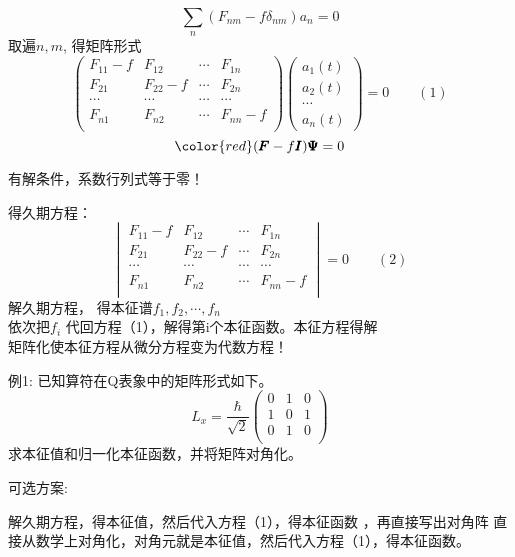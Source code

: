 \begin{frame} 
    $$ \sum_n (F_{nm} -f \delta_{nm})a_n=0 $$
    取遍$n,m$, 得矩阵形式\\            
    $$\begin{pmatrix}
        F_{11}-f & F_{12} & \cdots & F_{1n} \\
        F_{21} & F_{22}-f & \cdots & F_{2n} \\
        \cdots & \cdots &  \cdots& \cdots\\
         F_{n1} & F_{n2} & \cdots & F_{nn}-f \\
     \end{pmatrix}
     \begin{pmatrix}
         a_1(t)\\
         a_2(t)\\
         \cdots \\
         a_n(t)
     \end{pmatrix}
     =0 \qquad (1)$$
     $$ \color{red} (\pmb F -f \pmb I) \pmb \Psi =0 $$

    有解条件，系数行列式等于零！
\end{frame}

\begin{frame} 
    得久期方程：
    $$\begin{vmatrix}
        F_{11}-f & F_{12} & \cdots & F_{1n} \\
        F_{21} & F_{22}-f & \cdots & F_{2n} \\
        \cdots & \cdots &  \cdots& \cdots\\
         F_{n1} & F_{n2} & \cdots & F_{nn}-f \\
     \end{vmatrix} 
     =0 \qquad (2) $$
     解久期方程， 得本征谱{$f_1,f_2,\cdots, f_n $}\\
     依次把$f_i$ 代回方程（1），解得第i个本征函数。本征方程得解\\
     矩阵化使本征方程从微分方程变为代数方程！
\end{frame}

\begin{frame} 
    \begin{tcolorbox2}{例1:}
        已知算符在Q表象中的矩阵形式如下。
        $$ L_x= \frac{\hbar}{\sqrt{2}}
        \begin{pmatrix}
            0 & 1 & 0  \\
            1 & 0 & 1  \\
            0 & 1 & 0 \\
         \end{pmatrix} $$
        求本征值和归一化本征函数，并将矩阵对角化。
    \end{tcolorbox2}
    可选方案:
    \begin{itemize}
        \done 解久期方程，得本征值，然后代入方程（1），得本征函数 ，再直接写出对角阵 
        \todo 直接从数学上对角化，对角元就是本征值，然后代入方程（1），得本征函数。
     \end{itemize}
\end{frame}

